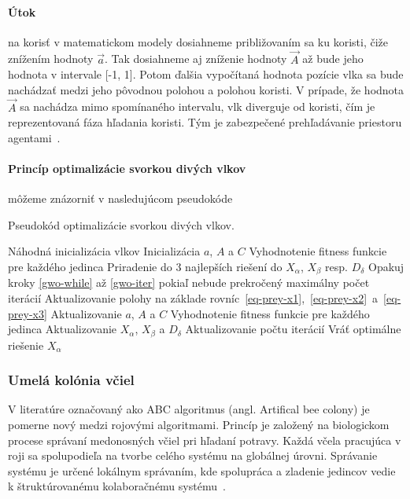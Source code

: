 \documentclass[a4paper,slovak,12pt,appendix]{article}
\begin{document}
\paragraph{Útok} na korisť v matematickom modely dosiahneme približovaním sa ku
koristi, čiže znížením hodnoty $\vec{a}$. Tak dosiahneme aj zníženie hodnoty
$\vec{A}$ až bude jeho hodnota v intervale [-1, 1]. Potom ďalšia vypočítaná
hodnota pozície vlka sa bude nachádzať medzi jeho pôvodnou polohou a polohou
koristi. V prípade, že hodnota $\vec{A}$ sa nachádza mimo spomínaného
intervalu, vlk diverguje od koristi, čím je reprezentovaná fáza hľadania koristi.
Tým je zabezpečené prehľadávanie priestoru agentami~\cite{Seeley1991}.

\paragraph{Princíp optimalizácie svorkou divých vlkov} môžeme znázorniť
v nasledujúcom pseudokóde~\cite{Seeley1991}
\begin{algorithm}[H]
  \caption{Pseudokód optimalizácie svorkou divých vlkov.}
  \begin{algorithmic}[1]
    \State Náhodná inicializácia vlkov
    \State Inicializácia $a$, $A$ a $C$
    \State Vyhodnotenie fitness funkcie pre každého jedinca
    \State Priradenie do 3 najlepších riešení do $X_\alpha$, $X_\beta$ resp. $D_\delta$
    \State Opakuj kroky \ref{gwo-while} až \ref{gwo-iter} pokiaľ nebude prekročený maximálny počet iterácií \label{gwo-while}
    \State Aktualizovanie polohy na základe rovníc~\ref{eq-prey-x1},~\ref{eq-prey-x2}~a~\ref{eq-prey-x3}
    \State Aktualizovanie $a$, $A$ a $C$
    \State Vyhodnotenie fitness funkcie pre každého jedinca
    \State Aktualizovanie $X_\alpha$, $X_\beta$ a $D_\delta$
    \State Aktualizovanie počtu iterácií \label{gwo-iter}
    \State Vráť optimálne riešenie $X_\alpha$
  \end{algorithmic}
\end{algorithm}


\subsubsection{Umelá kolónia včiel}
V literatúre označovaný ako ABC algoritmus (angl. Artifical bee colony) je pomerne
nový medzi rojovými algoritmami. Princíp je založený na biologickom procese
správaní medonosných včiel pri hľadaní potravy. Každá včela pracujúca
v roji sa spolupodieľa na tvorbe celého systému na globálnej úrovni. Správanie
systému je určené lokálnym správaním, kde spolupráca a zladenie jedincov vedie
k štruktúrovanému kolaboračnému systému~\cite{Chavan2015}.
\end{document}

